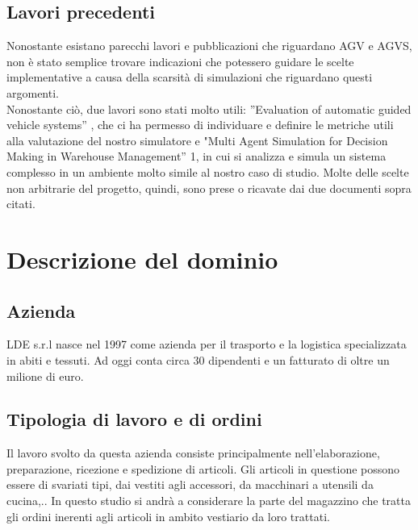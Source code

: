 \documentclass[12pt]{article}
\begin{document}
\subsection{Lavori precedenti}
Nonostante esistano parecchi lavori e pubblicazioni che riguardano AGV e AGVS, non è stato semplice trovare indicazioni che potessero guidare le scelte implementative a causa della scarsità di simulazioni che riguardano questi argomenti.\\

\noindent Nonostante ciò, due lavori sono stati molto utili:  ”Evaluation of automatic guided vehicle systems” \cite{EvaluationAGVS}, che ci ha permesso di individuare e definire le metriche utili alla valutazione del nostro simulatore e "Multi Agent Simulation for Decision Making in Warehouse Management” 1\cite{MAS_Warehouse}, in cui si analizza e simula un sistema complesso in un ambiente molto simile al nostro caso di studio.
Molte delle scelte non arbitrarie del progetto, quindi, sono prese o ricavate dai due documenti sopra citati.

\newpage
\section{Descrizione del dominio}
\subsection{Azienda}
LDE s.r.l nasce nel 1997 come azienda per il trasporto e la logistica specializzata in abiti e tessuti. Ad oggi conta circa 30 dipendenti e un fatturato di oltre un milione di euro.

\subsection{Tipologia di lavoro e di ordini}
Il lavoro svolto da questa azienda consiste principalmente nell'elaborazione, preparazione, ricezione e spedizione di articoli. Gli articoli in questione possono essere di svariati tipi, dai vestiti agli accessori, da macchinari a utensili da cucina,..
In questo studio si andrà a considerare la parte del magazzino che tratta gli ordini inerenti agli articoli in ambito vestiario da loro trattati.
\end{document}
